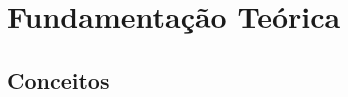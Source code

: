 
\chapter{Fundamentação Teórica} \label{Cap:Fundamentacao}




\section{Conceitos} \label{Sec:Conceitos}

